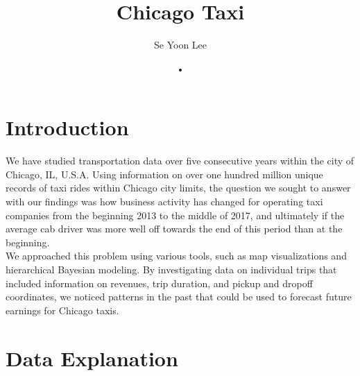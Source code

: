 \documentclass[11pt,a4paper]{article}
\author{Se Yoon Lee}
\title{Chicago Taxi}
\author{•}
\begin{document}
\maketitle

\begin{abstract}
\noindent 
\end{abstract}

\section{Introduction}
We have studied transportation data over five consecutive years within the city of Chicago, IL, U.S.A. Using information on over one hundred million unique records of taxi rides within Chicago city limits, the question we sought to answer with our findings was how business activity has changed for operating taxi companies from the beginning 2013 to the middle of 2017, and ultimately if the average cab driver was more well off towards the end of this period than at the beginning. \\
We approached this problem using various tools, such as map visualizations and hierarchical Bayesian modeling. By investigating data on individual trips that included information on revenues, trip duration, and pickup and dropoff coordinates, we noticed patterns in the past that could be used to forecast future earnings for Chicago taxis.
\section{Data Explanation}
\end{document}
